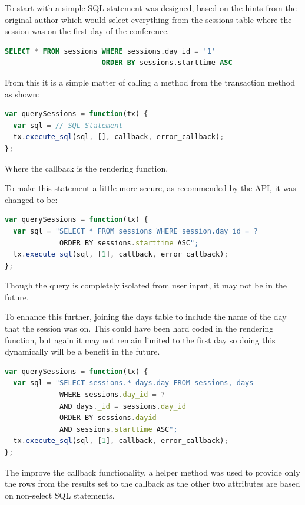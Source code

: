 \documentclass[10pt, a4paper]{article}
\begin{document}
To start with a simple SQL statement was designed, based on the hints from the
original author which would select everything from the sessions table where the
session was on the first day of the conference.

\begin{lstlisting}[language=sql]
SELECT * FROM sessions WHERE sessions.day_id = '1'
                       ORDER BY sessions.starttime ASC
\end{lstlisting}

From this it is a simple matter of calling a method from the transaction method
as shown:

\begin{lstlisting}[language=javascript]
var querySessions = function(tx) {
  var sql = // SQL Statement
  tx.execute_sql(sql, [], callback, error_callback);
};
\end{lstlisting}

Where the callback is the rendering function.

To make this statement a little more secure, as recommended by the API, it was
changed to be:

\begin{lstlisting}[language=javascript]
var querySessions = function(tx) {
  var sql = "SELECT * FROM sessions WHERE session.day_id = ? 
             ORDER BY sessions.starttime ASC";
  tx.execute_sql(sql, [1], callback, error_callback);
};
\end{lstlisting}

Though the query is completely isolated from user input, it may not be in the
future.

To enhance this further, joining the days table to include the name of the day
that the session was on. This could have been hard coded in the rendering
function, but again it may not remain limited to the first day so doing this
dynamically will be a benefit in the future.

\begin{lstlisting}[language=javascript]
var querySessions = function(tx) {
  var sql = "SELECT sessions.* days.day FROM sessions, days 
             WHERE sessions.day_id = ? 
             AND days._id = sessions.day_id 
             ORDER BY sessions.dayid 
             AND sessions.starttime ASC";
  tx.execute_sql(sql, [1], callback, error_callback);
};
\end{lstlisting}

The improve the callback functionality, a helper method was used to provide 
only the rows from the results set to the callback as the other two attributes 
are based on non-select SQL statements.
\end{document}

